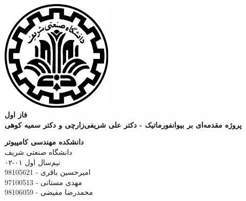 \documentclass{article}
\begin{document}
\begin{titlepage}
	\begin{center}
		\vspace{0.2cm}
		
		\includegraphics[width=0.4\textwidth]{sharif.png}\\
		\vspace{0.5cm}
		\textbf{ \Huge{فاز اول}}\\
		\vspace{0.25cm}
		\textbf{ \Large{پروژه مقدمه‌ای بر بیوانفورماتیک - دکتر علی  شریفی‌زارچی و دکتر سمیه کوهی}}
		\vspace{0.2cm}
		
		
		\large \textbf{دانشکده مهندسی کامپیوتر}\\\vspace{0.1cm}
		\large   دانشگاه صنعتی شریف\\\vspace{0.2cm}
		\large   ﻧﯿﻢ‌سال اول ۰۱-۰۲ \\\vspace{0.2cm}
		\large{\Large{امیرحسین باقری - 98105621}}\\
		\large{\Large{مهدی مستانی - 97100513}}\\
		\large{\Large{محمدرضا مفیضی - 98106059}}\\
	\end{center}
\end{titlepage}

\newpage

\pagestyle{fancy}
\fancyhf{}
\fancyfoot{}
\setlength{\headheight}{59pt}
\cfoot{\thepage}
\end{document}

